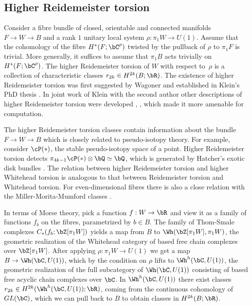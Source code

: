 \subsection{Higher Reidemeister torsion}
Consider a fibre bundle of closed, orientable and connected manifolds $F \to W \to B$ and a rank $1$ unitary local system \hbox{$\rho : \pi_1W \to U(1)$}. Assume that the cohomology of the fibre $H^*(F;\bC^\rho)$ twisted by the pullback of $\rho$ to $\pi_1F$ is trivial. More generally, it suffices to assume that $\pi_1B$ acts trivially on $H^*(F;\bC^\rho)$. The higher Reidemeister torsion of $W$ with respect to~$\rho$ is a collection of characteristic classes $r_{2k} \in H^{2k}(B;\bR)$. The existence of higher Reidemeister torsion was first suggested by Wagoner \cite{W76} and established in Klein's PhD thesis \cite{K89}. In joint work of Klein with the second author other descriptions of higher Reidemeister torsion were developed \cite{IK93a}, \cite{IK93}, which made it more amenable for computation.

The higher Reidemeister torsion classes contain information about the bundle \hbox{$F \to W\to B$} which is closely related to pseudo-isotopy theory. For example, consider $\cP(\ast)$, the stable pseudo-isotopy space of a point. Higher Reidemeister torsion detects $\pi_{4k-1}\cP( \ast) \otimes \bQ \simeq \bQ$, which is generated by Hatcher's exotic disk bundles \cite{I02}. The relation between higher Reidemeister torsion and higher Whitehead torsion is analogous to that between Reidemeister torsion and Whitehead torsion. For even-dimensional fibres there is also a close relation with the Miller-Morita-Mumford classes \cite{I04}.

In terms of Morse theory, pick a function $f:W \to \bR$ and view it as a family of functions $f_b$ on the fibres, parametrized by $b \in B$. The family of Thom-Smale complexes $C_*(f_b;\bZ[\pi_1W])$ yields a map from $B$ to $\Wh(\bZ[\pi_1W],\pi_1W)$, the geometric realization of the Whitehead category of based free chain complexes over $\bZ[\pi_1W]$. After applying $\rho:\pi_1 W \to U(1)$ we get a map $B \to \Wh(\bC,U(1))$, which by the condition on $\rho$ lifts to $\Wh^h(\bC,U(1))$, the geometric realization of the full subcategory of $\Wh(\bC,U(1))$ consisting of based free acyclic chain complexes over $\bC$. In $\Wh^h(\bC,U(1))$ there exist classes $r_{2k} \in H^{2k}(\Wh^h(\bC,U(1)); \bR)$, coming from the continuous cohomology of $GL(\bC)$, which we can pull back to $B$ to obtain classes in $H^{2k}(B; \bR)$.

